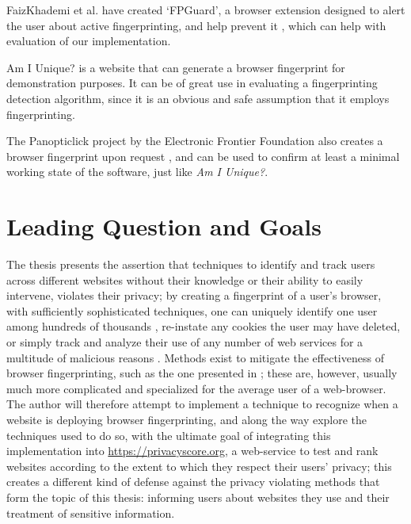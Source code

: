 \documentclass[
    fontsize=12pt,
    headings=small,
    parskip=half,
    bibliography=totoc,
    numbers=noenddot,
    open=any
    ]{scrreprt}
\begin{document}
FaizKhademi et al. have created `FPGuard', a browser extension designed to alert the user about active
fingerprinting, and help prevent it \cite{faizkhademi2015fpguard}, which can help with evaluation of our
implementation.

Am I Unique? \cite{am_i_unique} is a website that can generate a browser fingerprint for demonstration
purposes. It can be of great use in evaluating a fingerprinting detection algorithm, since it is an obvious and
safe assumption that it employs fingerprinting.

The Panopticlick project by the Electronic Frontier Foundation also creates a browser fingerprint upon request
\cite{panopticlick},
and can be used to confirm at least a minimal working state of the software, just like \textit{Am I Unique?}.


\begingroup
\renewcommand{\cleardoublepage}{}
\renewcommand{\clearpage}{}
\chapter{Leading Question and Goals} %
\endgroup

The thesis presents the assertion that techniques to identify and track users across different websites without
their knowledge or their ability to easily intervene, violates their privacy; by creating a fingerprint
of a user's browser, with sufficiently sophisticated techniques, one can uniquely identify one user
among hundreds of thousands \cite{am_i_unique}, re-instate any cookies the user may have deleted,
or simply track and analyze their use of any number of web services for a multitude of malicious reasons \cite{eckersley2010unique}.
Methods exist to mitigate the effectiveness of browser fingerprinting, such as the one presented
in \cite{laperdrix2015mitigating};
these are, however, usually much more complicated and specialized for the average user of a web-browser.
The author will therefore attempt to implement a technique to recognize when a website is deploying browser fingerprinting,
and along the way explore the techniques used to do so, with the ultimate goal of integrating this implementation into
\url{https://privacyscore.org}, a web-service to test and rank websites according to the extent to which they
respect their users' privacy; this creates a different kind of defense against the privacy violating
methods that form the topic of this thesis: informing users about websites they use and their treatment of
sensitive information.
\end{document}

